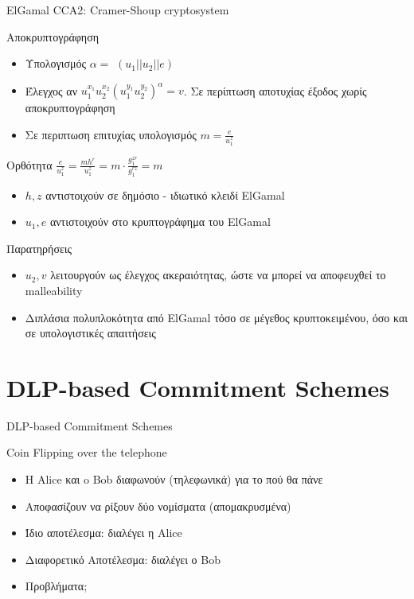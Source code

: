 \documentclass[handout]{beamer}
\begin{document}
\begin{frame}[allowframebreaks]{ElGamal CCA2: Cramer-Shoup cryptosystem}
\framebreak
\begin{block}{Αποκρυπτογράφηση}
\begin{itemize}
\item Υπολογισμός $\alpha = $ \hash$(u_1||u_2||e)$
\item Έλεγχος αν $u_1^{x_1}u_2^{x_2}(u_1^{y_1}u_2^{y_2})^\alpha=v$. Σε περίπτωση αποτυχίας έξοδος χωρίς αποκρυπτογράφηση
\item Σε περιπτωση επιτυχίας υπολογισμός $m = \frac{e}{u_1^z}$
\end{itemize}
\end{block}
\framebreak
\begin{block}{Ορθότητα}
$\frac{e}{u_1^z} = \frac{mh^r}{u_1^z} = m \cdot \frac{g_1^{zr}}{g_1^{rz}} = m$
\begin{itemize}
\item $h,z$ αντιστοιχούν σε δημόσιο - ιδιωτικό κλειδί  ElGamal
\item $u_1, e$ αντιστοιχούν στο κρυπτογράφημα του ElGamal
\end{itemize}
\end{block}

\begin{block}{Παρατηρήσεις}
\begin{itemize}
\item $u_2,v$ λειτουργούν ως έλεγχος ακεραιότητας, ώστε να  μπορεί να αποφευχθεί το malleability 
\item Διπλάσια πολυπλοκότητα από ElGamal τόσο σε μέγεθος κρυπτοκειμένου, όσο και σε υπολογιστικές απαιτήσεις
\end{itemize}
\end{block}
\end{frame}

\section{DLP-based Commitment Schemes}
\begin{frame}{DLP-based Commitment Schemes}
\begin{block}{Coin Flipping over the telephone}
\begin{itemize}
\item Η Alice και o Bob διαφωνούν (τηλεφωνικά) για το πού θα πάνε
\pause
\item Αποφασίζουν να ρίξουν δύο νομίσματα (απομακρυσμένα)
\pause
\item Ίδιο αποτέλεσμα: διαλέγει η Alice
\pause
\item Διαφορετικό Αποτέλεσμα: διαλέγει ο Bob
\pause
\item Προβλήματα;
\end{itemize}
\end{block}
\end{frame}
\end{document}

